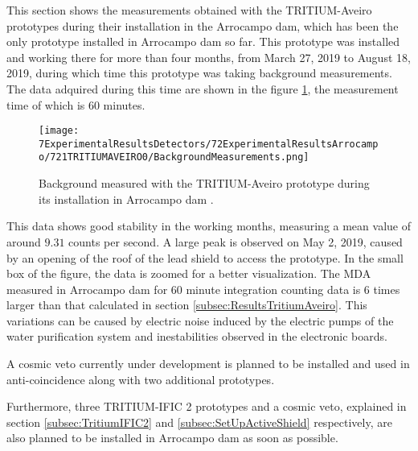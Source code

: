 This section shows the measurements obtained with the TRITIUM-Aveiro prototypes during their installation in the Arrocampo dam, which has been the only prototype installed in Arrocampo dam so far. This prototype was installed and working there for more than four months, from March 27, 2019 to August 18, 2019, during which time this prototype was taking background measurements. The data adquired during this time are shown in the figure \ref{fig:BackgroundArrocampoAveiro}, the measurement time of which is 60 minutes.

\begin{figure}[h]
\centering
\texttt{[image: 7ExperimentalResultsDetectors/72ExperimentalResultsArrocampo/721TRITIUMAVEIRO0/BackgroundMeasurements.png]}
\caption{Background measured with the TRITIUM-Aveiro prototype during its installation in Arrocampo dam \cite{ExperimentalPaperCarlos}.\label{fig:BackgroundArrocampoAveiro}}
\end{figure}

This data shows good stability in the working months, measuring a mean value of around $9.31$ counts per second. A large peak is observed on May 2, 2019, caused by an opening of the roof of the lead shield to access the prototype. In the small box of the figure, the data is zoomed for a better visualization. The MDA measured in Arrocampo dam for 60 minute integration counting data is 6 times larger than that calculated in section \ref{subsec:ResultsTritiumAveiro}. This variations can be caused by electric noise induced by the electric pumps of the water purification system and inestabilities observed in the electronic boards.

A cosmic veto currently under development is planned to be installed and used in anti-coincidence along with two additional prototypes.

Furthermore, three TRITIUM-IFIC 2 prototypes and a cosmic veto, explained in section \ref{subsec:TritiumIFIC2} and \ref{subsec:SetUpActiveShield} respectively, are also planned to be installed in Arrocampo dam as soon as possible.